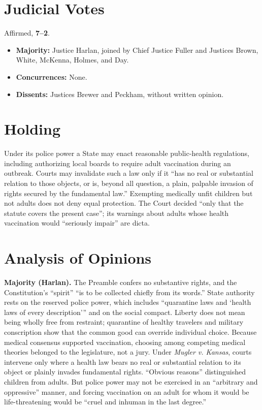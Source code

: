 \documentclass[12pt]{article}
\begin{document}
\section{Judicial Votes}

Affirmed, \textbf{7--2}.
\begin{itemize}
\item \textbf{Majority:} Justice Harlan, joined by Chief Justice Fuller and Justices Brown, White, McKenna, Holmes, and Day.
\item \textbf{Concurrences:} None.
\item \textbf{Dissents:} Justices Brewer and Peckham, without written opinion.
\end{itemize}

\section{Holding}

Under its police power a State may enact reasonable public-health regulations, including authorizing local boards to require adult vaccination during an outbreak. Courts may invalidate such a law only if it ``has no real or substantial relation to those objects, or is, beyond all question, a plain, palpable invasion of rights secured by the fundamental law.'' Exempting medically unfit children but not adults does not deny equal protection. The Court decided ``only that the statute covers the present case''; its warnings about adults whose health vaccination would ``seriously impair'' are dicta.

\section{Analysis of Opinions}

\textbf{Majority (Harlan).} The Preamble confers no substantive rights, and the Constitution's ``spirit'' ``is to be collected chiefly from its words.'' State authority rests on the reserved police power, which includes ``quarantine laws and `health laws of every description''' and on the social compact. Liberty does not mean being wholly free from restraint; quarantine of healthy travelers and military conscription show that the common good can override individual choice. Because medical consensus supported vaccination, choosing among competing medical theories belonged to the legislature, not a jury. Under \textit{Mugler v. Kansas}, courts intervene only where a health law bears no real or substantial relation to its object or plainly invades fundamental rights. ``Obvious reasons'' distinguished children from adults. But police power may not be exercised in an ``arbitrary and oppressive'' manner, and forcing vaccination on an adult for whom it would be life-threatening would be ``cruel and inhuman in the last degree.''
\end{document}
